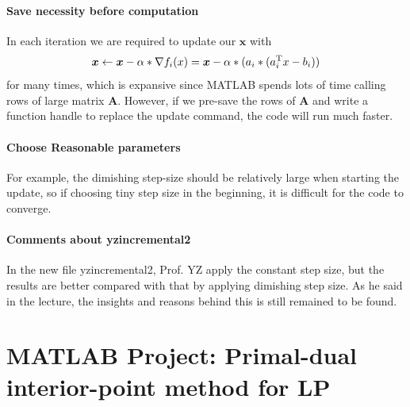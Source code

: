 \paragraph{Save necessity before computation}
In each iteration we are required to update our $\bm x$ with 
\[
\bm x\leftarrow\bm x-\alpha*\nabla f_i(x)=\bm x-\alpha*(a_i*(a_i^{\mathrm T} x-b_i))
\] 
for many times, which is expansive since MATLAB spends lots of time calling rows of large matrix $\bm A$. However, if we pre-save the rows of $\bm A$ and write a function handle to replace the update command, the code will run much faster.
\paragraph{Choose Reasonable parameters}
For example, the dimishing step-size should be relatively large when starting the update, so if choosing tiny step size in the beginning, it is difficult for the code to converge.
\paragraph{Comments about yzincremental2}
In the new file yzincremental2, Prof. YZ apply the constant step size, but the results are better compared with that by applying dimishing step size. As he said in the lecture, the insights and reasons behind this is still remained to be found.










\clearpage
\section*{MATLAB Project: Primal-dual interior-point method for LP}
